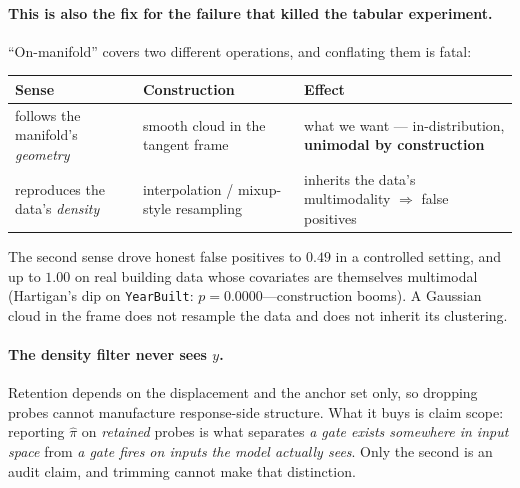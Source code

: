\documentclass[11pt]{article}
\newcommand{\pihat}{\hat{\pi}}
\begin{document}
\paragraph{This is also the fix for the failure that killed the tabular experiment.}
``On-manifold'' covers two different operations, and conflating them is fatal:

\begin{table}[h]
\small\centering
\begin{tabular}{@{}p{}p{}p{}@{}}
\toprule
\textbf{\sffamily Sense} & \textbf{\sffamily Construction} & \textbf{\sffamily Effect}\\
\midrule
follows the manifold's \emph{geometry} & smooth cloud in the tangent frame
  & what we want --- in-distribution, \textbf{unimodal by construction}\\
reproduces the data's \emph{density} & interpolation / mixup-style resampling
  & inherits the data's multimodality $\Rightarrow$ false positives\\
\bottomrule
\end{tabular}
\end{table}

\noindent The second sense drove honest false positives to $0.49$ in a controlled setting, and up
to $1.00$ on real building data whose covariates are themselves multimodal (Hartigan's dip on
\texttt{YearBuilt}: $p = 0.0000$---construction booms). A Gaussian cloud in the frame does not
resample the data and does not inherit its clustering.

\paragraph{The density filter never sees $y$.} Retention depends on the displacement and the
anchor set only, so dropping probes cannot manufacture response-side structure. What it buys is
claim scope: reporting $\pihat$ on \emph{retained} probes is what separates \emph{a gate exists
somewhere in input space} from \emph{a gate fires on inputs the model actually sees}. Only the
second is an audit claim, and trimming cannot make that distinction.
\end{document}
